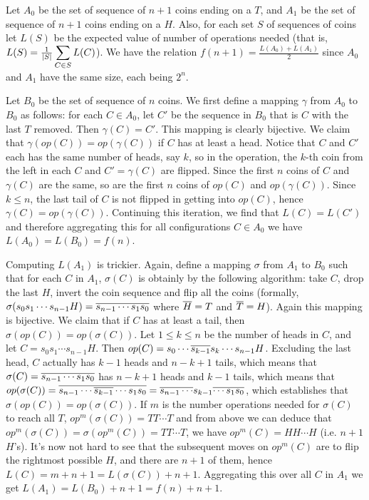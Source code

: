 \documentclass[11pt,a4paper]{article}
\begin{document}
\begin{enumerate}
	Let $A_0$ be the set of sequence of $n+1$ coins ending on a $T$, and $A_1$ be the set of sequence of $n+1$ coins ending on a $H$. Also, for each set $S$ of sequences of coins let $L(S)$ be the expected value of number of operations needed (that is, $L(S)=\frac{1}{|S|}\displaystyle\sum_{C\in S}L(C)$). 
	We have the relation $f(n+1)=\frac{L(A_0)+L(A_1)}{2}$ since $A_0$ and $A_1$ have the same size, each being $2^n$. 
	
	Let $B_0$ be the set of sequence of $n$ coins. We first define a mapping $\gamma$ from $A_0$ to $B_0$ as follows: for each $C\in A_0$, let $C'$ be the sequence in $B_0$ that is $C$ with the last $T$ removed. Then $\gamma(C)=C'$. This mapping is clearly bijective. We claim that $\gamma(op(C))=op(\gamma(C))$ if $C$ has at least a head. Notice that $C$ and $C'$ each has the same number of heads, say $k$, so in the operation, the $k$-th coin from the left in each $C$ and $C'=\gamma(C)$ are flipped. 
	Since the first $n$ coins of $C$ and $\gamma(C)$ are the same, so are the first $n$ coins of $op(C)$ and $op(\gamma(C))$. Since $k\le n$, the last tail of $C$ is not flipped in getting into $op(C)$, hence $\gamma(C)=op(\gamma(C))$. 
	Continuing this iteration, we find that $L(C)=L(C')$ and therefore aggregating this for all configurations $C\in A_0$ we have $L(A_0)=L(B_0)=f(n)$. 
	
	Computing $L(A_1)$ is trickier. Again, define a mapping $\sigma$ from $A_1$ to $B_0$ such that for each $C$ in $A_1$, $\sigma(C)$ is obtainly by the following algorithm: take $C$, drop the last $H$, invert the coin sequence and flip all the coins (formally, $\sigma(s_0s_1\cdots s_{n-1}H)=\overline{s_{n-1}\cdots s_1s_0}$ where $\overline{H}=T$ and $\overline{T}=H$). 
	Again this mapping is bijective. 
	We claim that if $C$ has at least a tail, then $\sigma(op(C))=op(\sigma(C))$. 
	Let $1\le k\le n$ be the number of heads in $C$, and let $C=s_0s_1\cdots s_{n-1}H$. 
	Then $op(C)=s_0\cdots \overline{s_{k-1}}s_k\cdots s_{n-1}H$. 
	Excluding the last head, $C$ actually has $k-1$ heads and $n-k+1$ tails, which means that $\sigma(C)=\overline{s_{n-1}\cdots s_1s_0}$ has $n-k+1$ heads and $k-1$ tails, which means that $op(\sigma(C))=\overline{s_{n-1}\cdots\overline{s_{k-1}}\cdots s_1s_0}=\overline{s_{n-1}\cdots}s_{k-1}\overline{\cdots s_1s_0}$, which establishes that $\sigma(op(C))=op(\sigma(C))$. 
	If $m$ is the number operations needed for $\sigma(C)$ to reach all $T$, $op^{m}(\sigma(C))=TT\cdots T$ and from above we can deduce that $op^{m}(\sigma(C))=\sigma(op^{m}(C))=TT\cdots T$, we have $op^{m}(C)=HH\cdots H$ (i.e. $n+1$ $H$'s). 
	It's now not hard to see that the subsequent moves on $op^{m}(C)$ are to flip the rightmost possible $H$, and there are $n+1$ of them, hence $L(C)=m+n+1=L(\sigma(C))+n+1$. 
	Aggregating this over all $C$ in $A_1$ we get $L(A_1)=L(B_0)+n+1=f(n)+n+1$. 
	

\end{enumerate}
\end{document}
